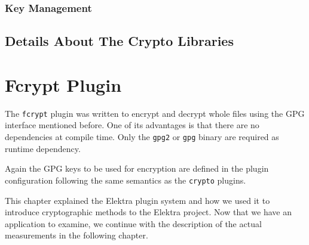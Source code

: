 \subsubsection{Key Management}



\subsection{Details About The Crypto Libraries}\label{details-about-the-crypto-libraries}



\section{Fcrypt Plugin}\label{fcrypt-plugin}

The \texttt{fcrypt} plugin was written to encrypt and decrypt whole files using the GPG interface mentioned before.
One of its advantages is that there are no dependencies at compile time.
Only the \texttt{gpg2} or \texttt{gpg} binary are required as runtime dependency.

Again the GPG keys to be used for encryption are defined in the plugin configuration following the same semantics as the \texttt{crypto} plugins.

This chapter explained the Elektra plugin system and how we used it to introduce cryptographic methods to the Elektra project.
Now that we have an application to examine, we continue with the description of the actual measurements in the following chapter.
